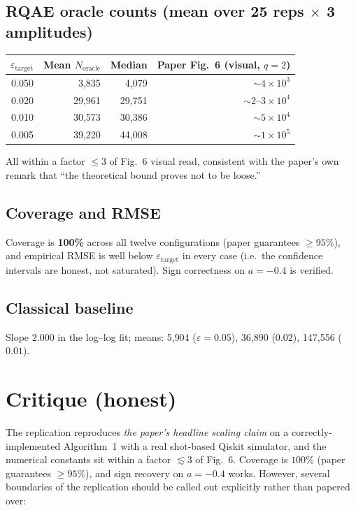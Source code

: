 \documentclass[11pt]{article}
\begin{document}
\subsection{RQAE oracle counts (mean over 25 reps $\times$ 3 amplitudes)}
\begin{center}
\begin{tabular}{@{}rrrr@{}}
\toprule
$\varepsilon_{\text{target}}$ & Mean $N_{\text{oracle}}$ & Median & Paper Fig.~6 (visual, $q=2$) \\
\midrule
0.050 & 3{,}835  & 4{,}079  & $\sim 4 \times 10^{3}$ \\
0.020 & 29{,}961 & 29{,}751 & $\sim 2$--$3 \times 10^{4}$ \\
0.010 & 30{,}573 & 30{,}386 & $\sim 5 \times 10^{4}$ \\
0.005 & 39{,}220 & 44{,}008 & $\sim 1 \times 10^{5}$ \\
\bottomrule
\end{tabular}
\end{center}
All within a factor $\leq 3$ of Fig.~6 visual read, consistent with the paper's
own remark that ``the theoretical bound proves not to be loose.''

\subsection{Coverage and RMSE}
Coverage is \textbf{100\%} across all twelve configurations (paper guarantees
$\geq 95\%$), and empirical RMSE is well below $\varepsilon_{\text{target}}$
in every case (i.e.\ the confidence intervals are honest, not saturated).
Sign correctness on $a = -0.4$ is verified.

\subsection{Classical baseline}
Slope $2.000$ in the log--log fit; means: 5{,}904 ($\varepsilon = 0.05$),
36{,}890 ($0.02$), 147{,}556 ($0.01$).

\section{Critique (honest)}

The replication reproduces \emph{the paper's headline scaling claim} on a
correctly-implemented Algorithm~1 with a real shot-based Qiskit simulator,
and the numerical constants sit within a factor $\lesssim 3$ of Fig.~6.
Coverage is $100\%$ (paper guarantees $\geq 95\%$), and sign recovery on
$a = -0.4$ works. However, several boundaries of the replication should be
called out explicitly rather than papered over:
\end{document}
